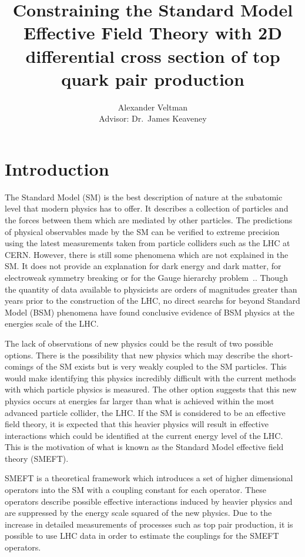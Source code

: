 \documentclass[a4paper,11pt]{article}
\title{Constraining the Standard Model Effective Field Theory with 2D differential cross section of top quark pair production}
\author{Alexander Veltman\\{\small Advisor: Dr.\ James Keaveney}}
\affil{Department of Physics,\\University of Cape Town}
\begin{document}
\maketitle

\begin{abstract}
\end{abstract}
\newpage
\section{Introduction}

The Standard Model (SM) is the best description of nature at the subatomic level that modern physics has to offer.
It describes a collection of particles and the forces between them which are mediated by other particles.
The predictions of physical observables made by the SM can be verified to extreme precision using the latest measurements taken from particle colliders such as the LHC at CERN.
However, there is still some phenomena which are not explained in the SM.
It does not provide an explanation for dark energy and dark matter, for electroweak symmetry breaking or for the Gauge hierarchy problem~\cite{morrissey2012}..
Though the quantity of data available to physicists are orders of magnitudes greater than years prior to the construction of the LHC, no direct searchs for beyond Standard Model (BSM) phenomena have found conclusive evidence of BSM physics at the energies scale of the LHC.

The lack of observations of new physics could be the result of two possible options.
There is the possibility that new physics which may describe the short-comings of the SM exists but is very weakly coupled to the SM particles.
This would make identifying this physics incredibly difficult with the current methods with which particle physics is measured.
The other option suggests that this new physics occurs at energies far larger than what is achieved within the most advanced particle collider, the LHC.
If the SM is considered to be an effective field theory, it is expected that this heavier physics will result in effective interactions which could be identified at the current energy level of the LHC.
This is the motivation of what is known as the Standard Model effective field theory (SMEFT).

SMEFT is a theoretical framework which introduces a set of higher dimensional operators into the SM with a coupling constant for each operator.
These operators describe possible effective interactions induced by heavier physics and are suppressed by the energy scale squared of the new physics.
Due to the increase in detailed measurements of processes such as top pair production, it is possible to use LHC data in order to estimate the couplings for the SMEFT operators.
\end{document}

